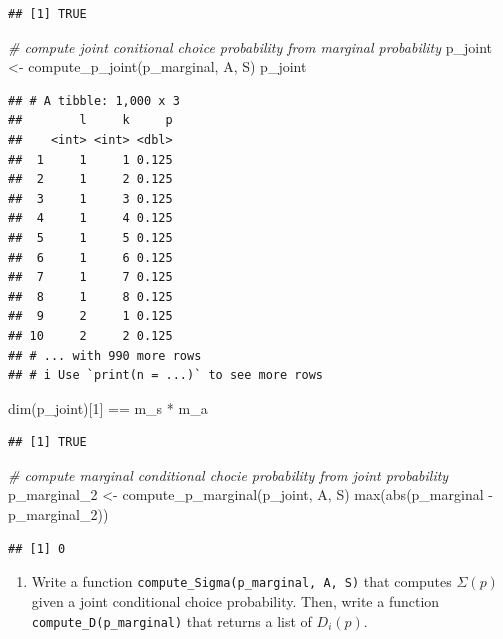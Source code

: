 \documentclass[
]{book}
\newenvironment{Shaded}{\begin{snugshade}}{\end{snugshade}}
\newcommand{\CommentTok}[1]{\textcolor[rgb]{0.56,0.35,0.01}{\textit{#1}}}
\newcommand{\DecValTok}[1]{\textcolor[rgb]{0.00,0.00,0.81}{#1}}
\newcommand{\FunctionTok}[1]{\textcolor[rgb]{0.00,0.00,0.00}{#1}}
\newcommand{\NormalTok}[1]{#1}
\newcommand{\OtherTok}[1]{\textcolor[rgb]{0.56,0.35,0.01}{#1}}
\newcommand{\SpecialCharTok}[1]{\textcolor[rgb]{0.00,0.00,0.00}{#1}}
\providecommand{\tightlist}{%
  \setlength{\itemsep}{0pt}\setlength{\parskip}{0pt}}
\begin{document}
\begin{verbatim}
## [1] TRUE
\end{verbatim}

\begin{Shaded}
\begin{Highlighting}[]
\CommentTok{\# compute joint conitional choice probability from marginal probability}
\NormalTok{p\_joint }\OtherTok{\textless{}{-}} \FunctionTok{compute\_p\_joint}\NormalTok{(p\_marginal, A, S)}
\NormalTok{p\_joint}
\end{Highlighting}
\end{Shaded}

\begin{verbatim}
## # A tibble: 1,000 x 3
##        l     k     p
##    <int> <int> <dbl>
##  1     1     1 0.125
##  2     1     2 0.125
##  3     1     3 0.125
##  4     1     4 0.125
##  5     1     5 0.125
##  6     1     6 0.125
##  7     1     7 0.125
##  8     1     8 0.125
##  9     2     1 0.125
## 10     2     2 0.125
## # ... with 990 more rows
## # i Use `print(n = ...)` to see more rows
\end{verbatim}

\begin{Shaded}
\begin{Highlighting}[]
\FunctionTok{dim}\NormalTok{(p\_joint)[}\DecValTok{1}\NormalTok{] }\SpecialCharTok{==}\NormalTok{ m\_s }\SpecialCharTok{*}\NormalTok{ m\_a}
\end{Highlighting}
\end{Shaded}

\begin{verbatim}
## [1] TRUE
\end{verbatim}

\begin{Shaded}
\begin{Highlighting}[]
\CommentTok{\# compute marginal conditional chocie probability from joint probability}
\NormalTok{p\_marginal\_2 }\OtherTok{\textless{}{-}} \FunctionTok{compute\_p\_marginal}\NormalTok{(p\_joint, A, S)}
\FunctionTok{max}\NormalTok{(}\FunctionTok{abs}\NormalTok{(p\_marginal }\SpecialCharTok{{-}}\NormalTok{ p\_marginal\_2))}
\end{Highlighting}
\end{Shaded}

\begin{verbatim}
## [1] 0
\end{verbatim}

\begin{enumerate}
\def\labelenumi{\arabic{enumi}.}
\setcounter{enumi}{5}
\tightlist
\item
  Write a function \texttt{compute\_Sigma(p\_marginal,\ A,\ S)} that computes \(\Sigma(p)\) given a joint conditional choice probability. Then, write a function \texttt{compute\_D(p\_marginal)} that returns a list of \(D_i(p)\).
\end{enumerate}
\end{document}
